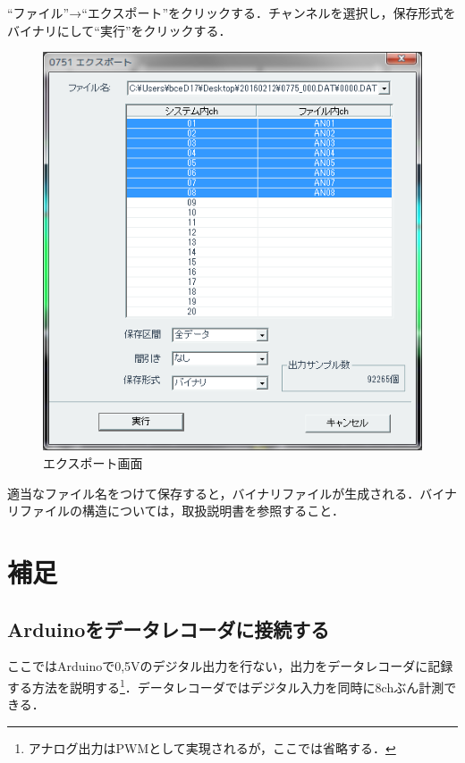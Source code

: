 \documentclass[a4j, twocolumn, openleft, uplatex, dvipdfmx]{jsbook}
\begin{document}
        ``ファイル''→``エクスポート''をクリックする．チャンネルを選択し，保存形式をバイナリにして``実行''をクリックする．

        \begin{figure}[H]
            \centering
            \includegraphics[width=\linewidth]{./figure/0751-export.png}
            \caption{エクスポート画面}
        \end{figure}
        適当なファイル名をつけて保存すると，バイナリファイルが生成される．バイナリファイルの構造については，取扱説明書を参照すること．
    \chapter{補足}
    \label{chap:補足}

        \section{Arduinoをデータレコーダに接続する}
        \label{sec:Arduinoをデータレコーダに接続する}

        ここではArduinoで0,5Vのデジタル出力を行ない，出力をデータレコーダに記録する方法を説明する\footnote{アナログ出力はPWMとして実現されるが，ここでは省略する．}．データレコーダではデジタル入力を同時に8chぶん計測できる．
\end{document}
